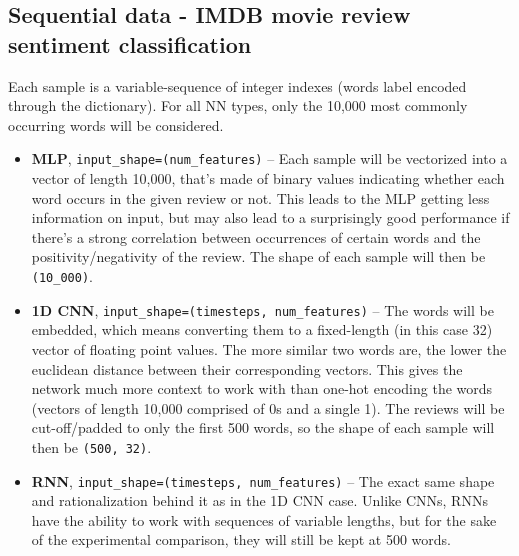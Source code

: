 \subsection{Sequential data - IMDB movie review sentiment classification}
\label{preprocessing-sequential}
Each sample is a variable-sequence of integer indexes (words label encoded through the dictionary).
For all NN types, only the 10,000 most commonly occurring words will be considered. 
\begin{itemize}
    \item \textbf{MLP}, \texttt{input\_shape=(num\_features)} -- Each sample will be vectorized into a vector
    of length 10,000, that's made of binary values indicating whether each word occurs
    in the given review or not. This leads to the MLP getting less information on input,
    but may also lead to a surprisingly good performance if there's a strong correlation between occurrences
    of certain words and the positivity/negativity of the review.
    The shape of each sample will then be \texttt{(10\_000)}.
    \item \textbf{1D CNN}, \texttt{input\_shape=(timesteps, num\_features)} -- The words will be embedded,
    which means converting them to a fixed-length (in this case 32) vector of floating point values.
    The more similar two words are, the lower the euclidean distance between their corresponding vectors.
    This gives the network much more context to work with than one-hot encoding the words (vectors of length
    10,000 comprised of 0s and a single 1). The reviews will be cut-off/padded to only the first 500 words,
    so the shape of each sample will then be \texttt{(500, 32)}.
    \item \textbf{RNN}, \texttt{input\_shape=(timesteps, num\_features)} -- The exact same shape and rationalization
    behind it as in the 1D CNN case. Unlike CNNs, RNNs have the ability to work with sequences of variable
    lengths, but for the sake of the experimental comparison, they will still be kept at 500 words.
\end{itemize}





